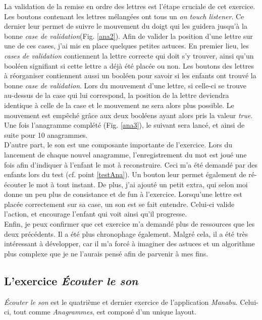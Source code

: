 La validation de la remise en ordre des lettres est l'étape cruciale de cet exercice. Les boutons contenant les lettres mélangées ont tous un \textit{on touch listener}. Ce dernier leur permet de suivre le mouvement du doigt qui les guidera jusqu'à la bonne \textit{case de validation}(Fig. \ref{ana2}). Afin de valider la position d'une lettre sur une de ces cases, j'ai mis en place quelques petites astuces. En premier lieu, les \textit{cases de validation} contiennent la lettre correcte qui doit s'y trouver, ainsi qu'un booléen signifiant si cette lettre a déjà été placée ou non. Les boutons des lettres à réorganiser contiennent aussi un booléen pour savoir si les enfants ont trouvé la bonne \textit{case de validation}. Lors du mouvement d'une lettre, si celle-ci se trouve au-dessus de la case qui lui correspond, la position de la lettre deviendra identique à celle de la case et le mouvement ne sera alors plus possible. Le mouvement est empêché grâce aux deux booléens ayant alors pris la valeur \textit{true}. Une fois l'anagramme complété (Fig. \ref{ana3}), le suivant sera lancé, et ainsi de suite pour 10 anagrammes.\\


D'autre part, le son est une composante importante de l'exercice. Lors du lancement de chaque nouvel anagramme, l'enregistrement du mot est joué une fois afin d'indiquer à l'enfant le mot à reconstruire. Ceci m'a été demandé par des enfants lors du test (cf. point \ref{testAna}). Un bouton leur permet également de ré-écouter le mot à tout instant. De plus, j'ai ajouté un petit extra, qui selon moi donne un peu plus de consistance et de fun à l'exercice. Lorsqu'une lettre est placée correctement sur sa case, un son est se fait entendre. Celui-ci valide l'action, et encourage l'enfant qui voit ainsi qu'il progresse.\\

Enfin, je peux confirmer que cet exercice m'a demandé plus de ressources que les deux précédents. Il a été plus chronophage également. Malgré cela, il a été très intéressant à développer, car il m'a forcé à imaginer des astuces et un algorithme plus complexe que je ne l'aurais pensé afin de parvenir à mes fins.



\subsection{L'exercice \textit{Écouter le son}}
\textit{Écouter le son} est le quatrième et dernier exercice de l'application \textit{Manabu}. Celui-ci, tout comme \textit{Anagrammes}, est composé d'un unique layout.\\

